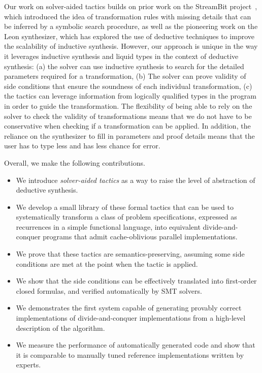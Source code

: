 Our work on solver-aided tactics builds on prior work on the StreamBit project~\cite{PLDI05/Solar-Lezama}, which
introduced the idea of transformation rules with missing details that can be inferred by a symbolic search procedure, as
well as the pioneering work on the Leon synthesizer, which has explored the use of deductive techniques to improve the
scalability of inductive synthesis. However, our approach is unique in the way it leverages inductive synthesis and
liquid types in the context of deductive synthesis: 
(a) the solver can use inductive synthesis to search for the detailed parameters required for a transformation,
(b) The solver can prove validity of side conditions that ensure the soundness of each individual transformation, 
(c) the tactics can leverage information from logically qualified types in the program in
    order to guide the transformation. 
The flexibility of being able to rely on the solver to check the validity of transformations means that we do not have to be conservative when checking if a transformation can be applied.
In addition, the reliance on the synthesizer to fill in parameters and proof details means that the user has to type less and has less chance for error.

Overall, we make the following contributions.
\begin{itemize}
\item We introduce \emph{solver-aided tactics} as a way to raise the level of abstraction of deductive synthesis.
\item We develop a small library of these formal tactics that can be used to 
  systematically transform a class of problem specifications,
  expressed as recurrences in a simple functional language,
  into equivalent divide-and-conquer programs that admit cache-oblivious parallel
  implementations.
\item We prove that these tactics are semantics-preserving, assuming some side conditions are met
  at the point when the tactic is applied.
\item We show that the side conditions can be effectively translated into first-order closed
  formulas, and verified automatically by SMT solvers.
\item We demonstrates the first system capable of generating provably correct implementations of divide-and-conquer implementations from a high-level description of the algorithm. 
\item We measure the performance of automatically generated code and show that it is comparable to manually tuned reference implementations written by experts.
\end{itemize}
